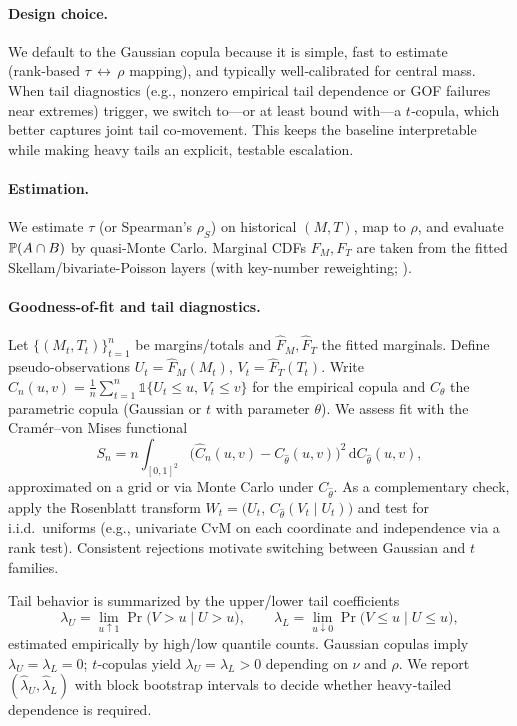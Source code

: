 \paragraph{Design choice.} We default to the Gaussian copula because it is simple, fast to estimate (rank‑based $\tau\,\leftrightarrow\,\rho$ mapping), and typically well‑calibrated for central mass. When tail diagnostics (e.g., nonzero empirical tail dependence or GOF failures near extremes) trigger, we switch to---or at least bound with---a $t$‑copula, which better captures joint tail co‑movement. This keeps the baseline interpretable while making heavy tails an explicit, testable escalation.

\paragraph{Estimation.} We estimate $\tau$ (or Spearman’s $\rho_S$) on historical $(M,T)$, map to $\rho$, and evaluate $\mathbb{P}(A\cap B)$ by quasi-Monte Carlo. Marginal CDFs $F_M,F_T$ are taken from the fitted Skellam/bivariate-Poisson layers (with key-number reweighting; ).

\paragraph{Goodness-of-fit and tail diagnostics.}\label{subsec:copula-gof}
Let $\{(M_t,T_t)\}_{t=1}^n$ be margins/totals and $\hat F_M,\hat F_T$ the fitted marginals. Define pseudo-observations $U_t=\hat F_M(M_t)$, $V_t=\hat F_T(T_t)$. Write $\hat C_n(u,v)=\tfrac1n\sum_{t=1}^n \mathbb{1}\{U_t\le u,\,V_t\le v\}$ for the empirical copula and $C_\theta$ the parametric copula (Gaussian or $t$ with parameter $\theta$).
We assess fit with the Cramér–von Mises functional
\[
S_n= n\int_{[0,1]^2}\big(\hat C_n(u,v)-C_{\hat\theta}(u,v)\big)^2\,\mathrm d C_{\hat\theta}(u,v),
\]
approximated on a grid or via Monte Carlo under $C_{\hat\theta}$. As a complementary check, apply the Rosenblatt transform $W_t=\big(U_t,\, C_{\hat\theta}(V_t\mid U_t)\big)$ and test for i.i.d.\ uniforms (e.g., univariate CvM on each coordinate and independence via a rank test). Consistent rejections motivate switching between Gaussian and $t$ families.

Tail behavior is summarized by the upper/lower tail coefficients
\[
\lambda_U=\lim_{u\uparrow 1}\Pr\big(V>u\mid U>u\big),\qquad
\lambda_L=\lim_{u\downarrow 0}\Pr\big(V\le u\mid U\le u\big),
\]
estimated empirically by high/low quantile counts. Gaussian copulas imply $\lambda_U=\lambda_L=0$; $t$‑copulas yield $\lambda_U=\lambda_L>0$ depending on $\nu$ and $\rho$. We report $(\hat\lambda_U,\hat\lambda_L)$ with block bootstrap intervals to decide whether heavy‑tailed dependence is required.

